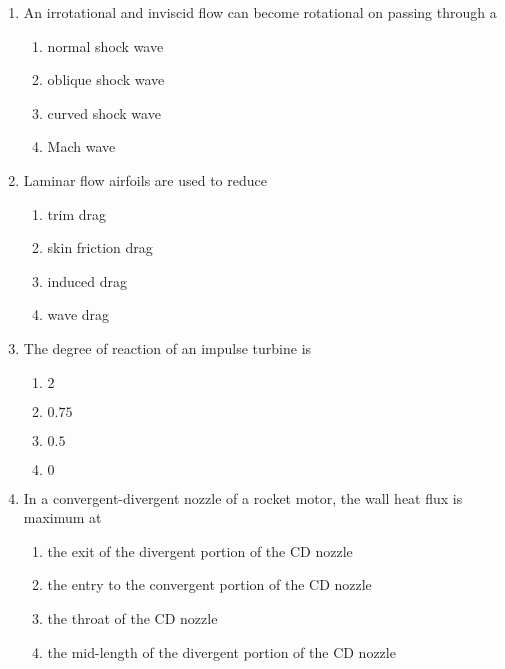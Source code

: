 \documentclass[journal]{IEEEtran}
\begin{document}
\begin{enumerate}
    \item An irrotational and inviscid flow can become rotational on passing through a

        \begin{multicols}{2}
            \begin{enumerate}
                \item normal shock wave
                \item oblique shock wave
                \item curved shock wave
                \item Mach wave
            \end{enumerate}
        \end{multicols}

    \item Laminar flow airfoils are used to reduce 

        \begin{multicols}{4}
            \begin{enumerate}
                \item trim drag
                \item skin friction drag
                \item induced drag
                \item wave drag
            \end{enumerate}
        \end{multicols}
        
    \item The degree of reaction of an impulse turbine is 

        \begin{multicols}{4}
            \begin{enumerate}
                \item $2$
                \item $0.75$
                \item $0.5$
                \item $0$
            \end{enumerate}
        \end{multicols}

    \item In a convergent-divergent  nozzle of a rocket motor, the wall heat flux is maximum at

        \begin{enumerate}
            \item the exit of the divergent portion of the CD nozzle
            \item the entry to the convergent portion of the CD nozzle
            \item the throat of the CD nozzle
            \item the mid-length of the divergent portion of the CD nozzle
        \end{enumerate}


\end{enumerate}
\end{document}

